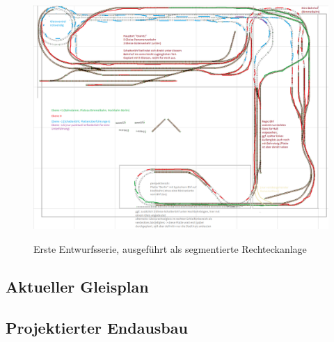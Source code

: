 \begin{figure}[h]
\centering
  \includegraphics[width=1.0\textwidth]{img/map_evolution/state3_granitz_modules.png}
	\label{img:state3_granitz_modules}
	\caption{Erste Entwurfsserie, ausgef\"uhrt als segmentierte Rechteckanlage}
\end{figure}


\subsection{Aktueller Gleisplan}
\label{sec:map_date}



\subsection{Projektierter Endausbau}
\label{sec:map_final_projected}



